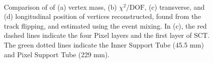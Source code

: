\begin{figure}[!htb]
    \centering
     \\
    \caption{Comparison of of (a) vertex mass, (b) $\chi^{2} / \mathrm{DOF}$, (c) transverse, and (d) longitudinal position of \xx vertices reconstructed, found from the track flipping, and estimated using the event mixing. In (c), the red dashed lines indicate the four Pixel layers and the first layer of SCT. The green dotted lines indicate the Inner Support Tube (45.5 mm) and Pixel Support Tube (229 mm).}
    \label{fig:random-crossing_vertex_dist}
\end{figure}












